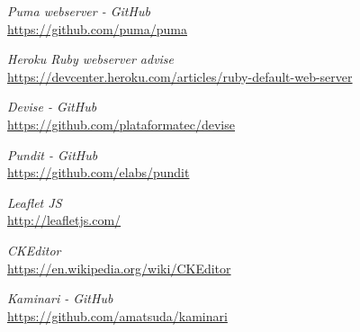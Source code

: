 \documentclass[a4paper]{article}
\begin{document}
\begin{thebibliography}{9}

\emph{Puma webserver - GitHub}\\
\url{https://github.com/puma/puma}

\emph{Heroku Ruby webserver advise}\\
\url {https://devcenter.heroku.com/articles/ruby-default-web-server}

\emph{Devise - GitHub}\\
\url{https://github.com/plataformatec/devise}

\emph{Pundit - GitHub}\\
\url{https://github.com/elabs/pundit}

\emph{Leaflet JS}\\
\url{http://leafletjs.com/}

\emph{CKEditor}\\
\url{https://en.wikipedia.org/wiki/CKEditor}

\emph{Kaminari - GitHub}\\
\url{https://github.com/amatsuda/kaminari}

\end{thebibliography}
\end{document}
